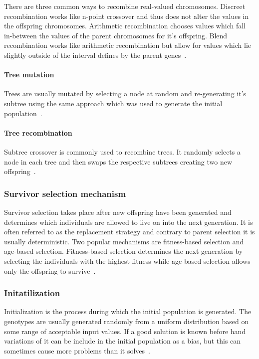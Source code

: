 There are three common ways to recombine real-valued chromosomes. Discreet recombination works like n-point crossover and thus does not alter the values in the offspring chromosomes. Arithmetic recombination chooses values which fall in-between the values of the parent chromosomes for it's offspring. Blend recombination works like arithmetic recombination but allow for values which lie slightly outside of the interval defines by the parent genes~\cite{Eiben201511}.


\paragraph{Tree mutation}

Trees are usually mutated by selecting a node at random and re-generating it's subtree using the same approach which was used to generate the initial population~\cite{Eiben201511}.

\paragraph{Tree recombination}

Subtree crossover is commonly used to recombine trees. It randomly selects a node in each tree and then swaps the respective subtrees creating two new offspring~\cite{Eiben201511}.


\subsubsection{Survivor selection mechanism}

Survivor selection takes place after new offspring have been generated and determines which individuals are allowed to live on into the next generation. It is often referred to as the replacement strategy and contrary to parent selection it is usually deterministic. Two popular mechanisms are fitness-based selection and age-based selection. Fitness-based selection determines the next generation by selecting the individuals with the highest fitness while age-based selection allows only the offspring to survive~\cite{Eiben2015_whatevolutionary}.


\subsubsection{Initatilization}

Initialization is the process during which the initial population is generated. The genotypes are usually generated randomly from a uniform distribution based on some range of acceptable input values. If a good solution is known before hand variations of it can be include in the initial population as a bias, but this can sometimes cause more problems than it solves~\cite{Eiben20021}.

